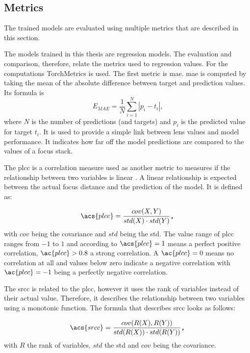 \subsection{Metrics}
\label{sec:Methods:Evaluation:Metrics}

The trained models are evaluated using multiple metrics that are described in this section.

The models trained in this thesis are regression models. The evaluation and comparison, therefore, relate the metrics used to regression values. For the computations TorchMetrics \cite{2022pytorchmetrics} is used. The first metric is \ac{mae}.  \Ac{mae} is computed by taking the mean of the absolute difference between target and prediction values. Its formula is \begin{equation} E_{MAE} = \frac{1}{N}\sum_{i=1}^N |p_i - t_i| \text{,} \end{equation} where $N$ is the number of predictions (and targets) and $p_i$ is the predicted value for target $t_i$.
It is used to provide a simple link between lens values and model performance. It indicates how far off the model predictions are compared to the values of a focus stack.

The \ac{plcc} \cite{pearson1909determination} is a correlation measure used as another metric to measures if the relationship between two variables is linear \cite{profillidis2019statistical}. A linear relationship is expected between the actual focus distance and the prediction of the model. It is defined as:

\begin{equation} \acs{plcc} = \frac{cov(X,Y)}{std(X) \cdot std(Y)} \texttt{,} \end{equation}
with $cov$ being the covariance and $std$ being the \acl{std}. The value range of \ac{plcc} ranges from $-1$ to $1$ and according to \textcite{profillidis2019statistical} $\acs{plcc} = 1$ means a perfect positive correlation, $\ac{plcc} > 0.8$ a strong correlation. A $\ac{plcc} = 0$ means no correlation at all and values below zero indicate a negative correlation with $\ac{plcc} = -1$ being a perfectly negative correlation.


The \ac{srcc} \cite{spearman1904proof} is related to the \ac{plcc}, however it uses the rank of variables instead of their actual value. Therefore, it describes the relationship between two variables using a monotonic function. The formula that describes \ac{srcc} looks as follows:

\begin{equation} \acs{srcc} = \frac{cov(R(X),R(Y))}{std(R(X)) \cdot std(R(Y))} \texttt{,} \end{equation} with $R$ the rank of variables, $std$ the \acl{std} and $cov$ being the covariance.

